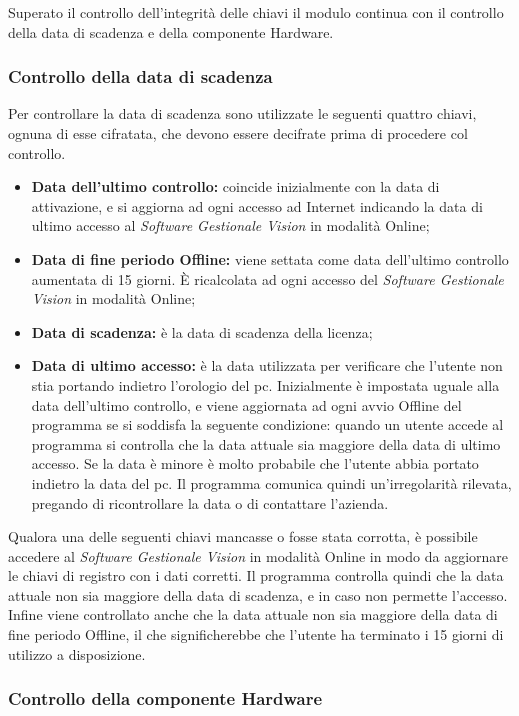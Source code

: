 Superato il controllo dell'integrità delle chiavi il modulo continua con il controllo della data di scadenza e della componente Hardware.

\subsubsection{Controllo della data di scadenza}

Per controllare la data di scadenza sono utilizzate le seguenti quattro chiavi, ognuna di esse cifratata, che devono essere decifrate prima di procedere col controllo. 
\begin{itemize}
\item \textbf{Data dell'ultimo controllo:} coincide inizialmente con la data di attivazione, e si aggiorna ad ogni accesso ad Internet indicando la data di ultimo accesso al \textit{Software Gestionale Vision} in modalità Online;
\item \textbf{Data di fine periodo Offline:} viene settata come data dell'ultimo controllo aumentata di 15 giorni. È ricalcolata ad ogni accesso del \textit{Software Gestionale Vision} in modalità Online;
\item \textbf{Data di scadenza:} è la data di scadenza della licenza;
\item \textbf{Data di ultimo accesso:} è la data utilizzata per verificare che l'utente non stia portando indietro l'orologio del pc. Inizialmente è impostata uguale alla data dell'ultimo controllo, e viene aggiornata ad ogni avvio Offline del programma se si soddisfa la seguente condizione: quando un utente accede al programma si controlla che la data attuale sia  maggiore della data di ultimo accesso. Se la data è minore è molto probabile che l'utente abbia portato indietro la data del pc. Il programma comunica quindi un'irregolarità rilevata, pregando di ricontrollare la data o di contattare l'azienda.
\end{itemize}
Qualora una delle seguenti chiavi mancasse o fosse stata corrotta, è possibile accedere al \textit{Software Gestionale Vision} in modalità Online in modo da aggiornare le chiavi di registro con i dati corretti.
Il programma controlla quindi che la data attuale non sia maggiore della data di scadenza, e in caso non permette l’accesso. Infine viene controllato anche che la data attuale non sia maggiore della data di fine periodo Offline, il che significherebbe che l’utente ha terminato i 15 giorni di utilizzo a disposizione.

\subsubsection{Controllo della componente Hardware}

